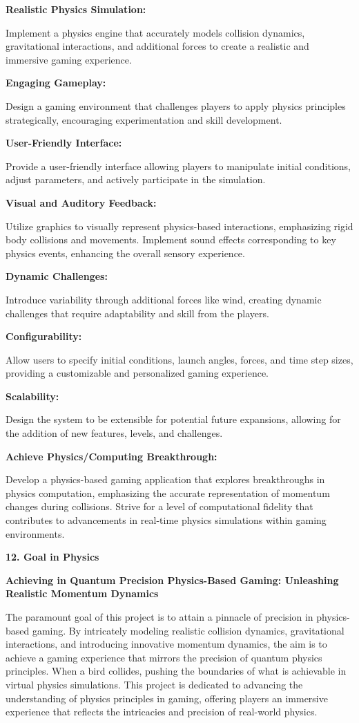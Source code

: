 \documentclass[
]{article}
\begin{document}
\textbf{Realistic Physics Simulation:}

Implement a physics engine that accurately models collision dynamics,
gravitational interactions, and additional forces to create a realistic
and immersive gaming experience.

\textbf{Engaging Gameplay:}

Design a gaming environment that challenges players to apply physics
principles strategically, encouraging experimentation and skill
development.

\textbf{User-Friendly Interface:}

Provide a user-friendly interface allowing players to manipulate initial
conditions, adjust parameters, and actively participate in the
simulation.

\textbf{Visual and Auditory Feedback:}

Utilize graphics to visually represent physics-based interactions,
emphasizing rigid body collisions and movements. Implement sound effects
corresponding to key physics events, enhancing the overall sensory
experience.

\textbf{Dynamic Challenges:}

Introduce variability through additional forces like wind, creating
dynamic challenges that require adaptability and skill from the players.

\textbf{Configurability:}

Allow users to specify initial conditions, launch angles, forces, and
time step sizes, providing a customizable and personalized gaming
experience.

\textbf{Scalability:}

Design the system to be extensible for potential future expansions,
allowing for the addition of new features, levels, and challenges.

\textbf{Achieve Physics/Computing Breakthrough:}

Develop a physics-based gaming application that explores breakthroughs
in physics computation, emphasizing the accurate representation of
momentum changes during collisions. Strive for a level of computational
fidelity that contributes to advancements in real-time physics
simulations within gaming environments.

\protect\hypertarget{qbn}{}{}\textbf{12. Goal in Physics}

\textbf{Achieving in Quantum Precision Physics-Based Gaming: Unleashing
Realistic Momentum Dynamics}

The paramount goal of this project is to attain a pinnacle of precision
in physics-based gaming. By intricately modeling realistic collision
dynamics, gravitational interactions, and introducing innovative
momentum dynamics, the aim is to achieve a gaming experience that
mirrors the precision of quantum physics principles. When a bird
collides, pushing the boundaries of what is achievable in virtual
physics simulations. This project is dedicated to advancing the
understanding of physics principles in gaming, offering players an
immersive experience that reflects the intricacies and precision of
real-world physics.
\end{document}
